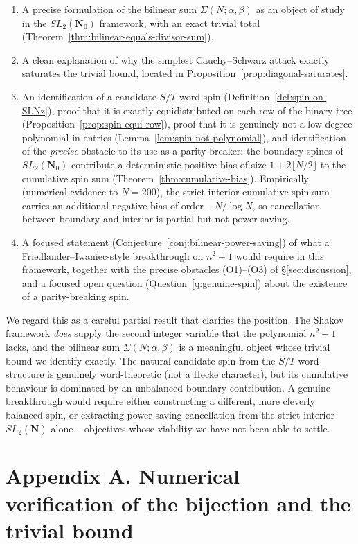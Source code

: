 \documentclass[11pt]{article}
\theoremstyle{definition}
\newcommand{\N}{\mathbf{N}}
\newcommand{\Nz}{\mathbf{N}_0}
\newcommand{\SLNz}{SL_2(\Nz)}
\newcommand{\SLN}{SL_2(\N)}
\begin{document}
\begin{enumerate}
\item A precise formulation of the bilinear sum
$\Sigma(N;\alpha,\beta)$ as an object of study in the $\SLNz$
framework, with an exact trivial total
(Theorem~\ref{thm:bilinear-equals-divisor-sum}).
\item A clean explanation of why the simplest Cauchy--Schwarz attack
exactly saturates the trivial bound, located in
Proposition~\ref{prop:diagonal-saturates}.
\item An identification of a candidate $S/T$-word spin
(Definition~\ref{def:spin-on-SLNz}), proof that it is exactly
equidistributed on each row of the binary tree
(Proposition~\ref{prop:spin-equi-row}), proof that it is genuinely not
a low-degree polynomial in entries
(Lemma~\ref{lem:spin-not-polynomial}), and identification of the
\emph{precise} obstacle to its use as a parity-breaker: the boundary
spines of $\SLNz$ contribute a deterministic positive bias of size
$1+2\lfloor N/2\rfloor$ to the cumulative spin sum
(Theorem~\ref{thm:cumulative-bias}). Empirically (numerical evidence to
$N=200$), the strict-interior cumulative spin sum carries an additional
negative bias of order $-N/\log N$, so cancellation between boundary and
interior is partial but not power-saving.
\item A focused statement (Conjecture~\ref{conj:bilinear-power-saving})
of what a Friedlander--Iwaniec-style breakthrough on $n^{2}+1$ would
require in this framework, together with the precise obstacles
(O1)--(O3) of \S\ref{sec:discussion}, and a focused open question
(Question~\ref{q:genuine-spin}) about the existence of a parity-breaking
spin.
\end{enumerate}

We regard this as a careful partial result that clarifies the position.
The Shakov framework \emph{does} supply the second integer variable
that the polynomial $n^{2}+1$ lacks, and the bilinear sum
$\Sigma(N;\alpha,\beta)$ is a meaningful object whose trivial bound we
identify exactly. The natural candidate spin from the $S/T$-word
structure is genuinely word-theoretic (not a Hecke character), but its
cumulative behaviour is dominated by an unbalanced boundary
contribution. A genuine breakthrough would require either constructing
a different, more cleverly balanced spin, or extracting power-saving
cancellation from the strict interior $\SLN$ alone -- objectives whose
viability we have not been able to settle.

\section*{Appendix A. Numerical verification of the bijection and the
trivial bound}
\end{document}
